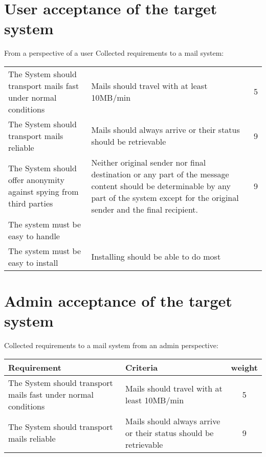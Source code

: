 \documentclass[11pt,a4paper]{book}
\begin{document}
\section{User acceptance of the target system}
From a perspective of a user 
Collected requirements to a mail system:\par
\begin{center}
\tablelasttail{\hline}
\begin{supertabular}{|p{5cm}|p{5cm}|c|}\hline
The System should transport mails fast under normal conditions & Mails should travel with at least 10MB/min & 5\\
The System should transport mails reliable & Mails should always arrive or their status should be retrievable & 9\\
The System should offer anonymity against spying from third parties & Neither original sender nor final destination or any part of the message content should be determinable by any part of the system except for the original sender and the final recipient.& 9\\
The system must be easy to handle &&\\
The system must be easy to install & Installing should be able to do most
\end{supertabular}
\end{center}

\section{Admin acceptance of the target system}
Collected requirements to a mail system from an admin perspective:\par
\begin{tabular}{|p{5cm}|p{5cm}|c|}\hline
Requirement& Criteria& weight\\\hline
The System should transport mails fast under normal conditions & Mails should travel with at least 10MB/min & 5\\
The System should transport mails reliable & Mails should always arrive or their status should be retrievable & 9\\
\hline\end{tabular}
\end{document}

